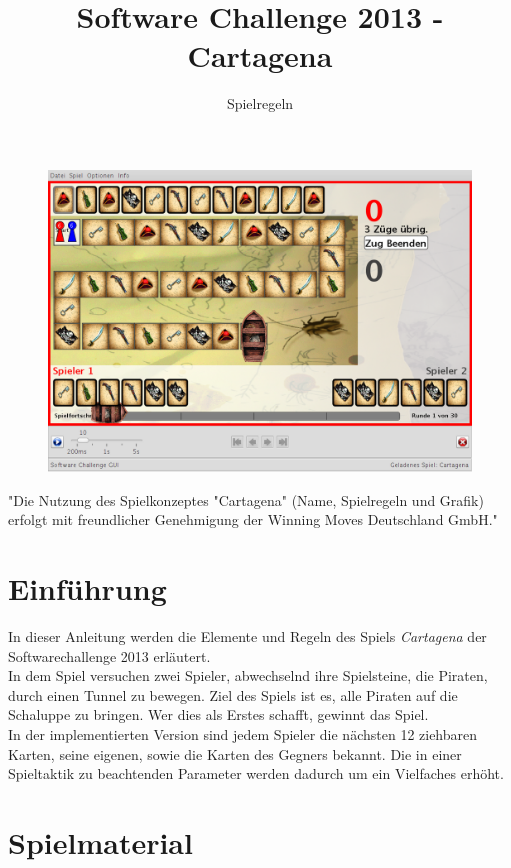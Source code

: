 \documentclass[a4paper, ngerman]{scrartcl}
\title{Software Challenge 2013 - Cartagena}
\subtitle{Spielregeln}
\begin{document}
\maketitle

\begin{figure}[h]
	\centering
	\includegraphics[width=\linewidth]{bilder/Uebersicht.png}
\end{figure}

"Die Nutzung des Spielkonzeptes "Cartagena" (Name, Spielregeln und Grafik)
erfolgt mit freundlicher Genehmigung der Winning Moves Deutschland GmbH."
\newpage
\tableofcontents
\newpage

\section{Einführung}
In dieser Anleitung werden die Elemente und Regeln des Spiels \emph{Cartagena}
der Soft\-ware\-challenge 2013 erläutert.\\
In dem Spiel versuchen zwei Spieler,
abwechselnd ihre Spielsteine, die Piraten, durch einen Tunnel zu bewegen.
Ziel des Spiels ist es, alle Piraten auf die Schaluppe zu bringen. Wer dies als
Erstes schafft, gewinnt das Spiel.\\
In der implementierten Version sind jedem Spieler die nächsten 12 ziehbaren
Karten, seine eigenen, sowie die Karten des Gegners bekannt. Die
in einer Spieltaktik zu beachtenden Parameter werden dadurch um ein Vielfaches
erhöht.

\section{Spielmaterial}
\end{document}
